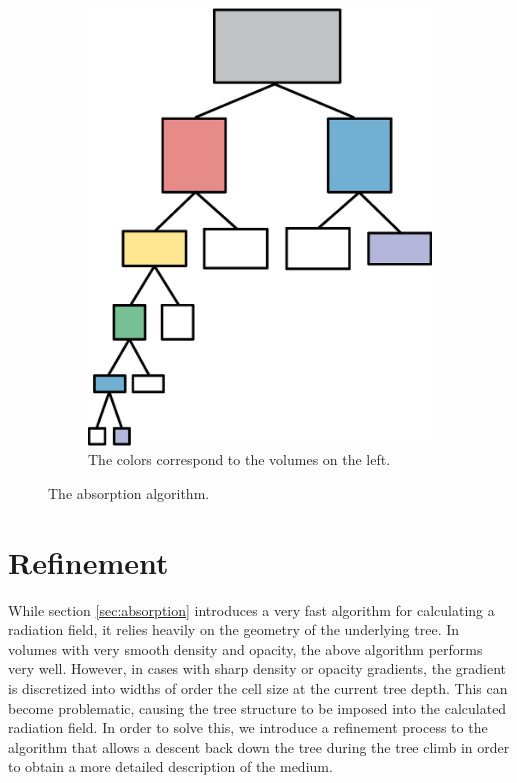 \begin{figure}
\begin{subfigure}[b]{0.45\textwidth}
                \includegraphics[width=\textwidth]{graphics/RT_tree.eps}
                \caption{The colors correspond to the volumes on the left.}
                \label{fig:absorptiontree}
        \end{subfigure}
        \caption[The absorption algorithm.]{The absorption algorithm.}\label{fig:absorption}
\end{figure}



\section{Refinement}
\label{sec:refinement}

While section \ref{sec:absorption} introduces a very fast algorithm for calculating a radiation field, it relies heavily on the geometry of the underlying tree. In volumes with very smooth density and opacity, the above algorithm performs very well. However, in cases with sharp density or opacity gradients, the gradient is discretized into widths of order the cell size at the current tree depth. This can become problematic, causing the tree structure to be imposed into the calculated radiation field. In order to solve this, we introduce a refinement process to the algorithm that allows a descent back down the tree during the tree climb in order to obtain a more detailed description of the medium.

